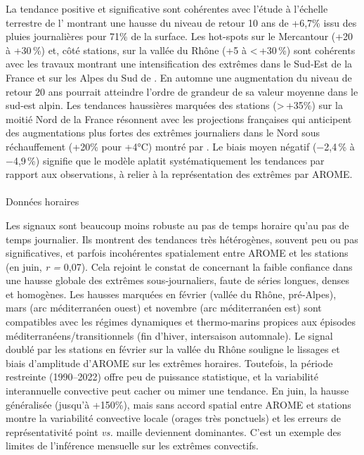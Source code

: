 \documentclass[
  article,
  nofooter,
  noheadings]{jss}
\makeatletter
\let\oldparagraph\paragraph
\renewcommand{\paragraph}{
    \@ifstar
      \xxxParagraphStar
      \xxxParagraphNoStar
  }
\newcommand{\xxxParagraphStar}[1]{\oldparagraph*{#1}\mbox{}}
\newcommand{\xxxParagraphNoStar}[1]{\oldparagraph{#1}\mbox{}}
\makeatother
\begin{document}
La tendance positive et significative sont cohérentes avec l'étude à
l'échelle terrestre de l'\citet{IPCC2021} montrant une hausse du niveau
de retour 10 ans de +6,7\% issu des pluies journalières pour 71\% de la
surface. Les hot-spots sur le Mercantour (+20 à +30\,\%) et, côté
stations, sur la vallée du Rhône (+5 à \textless\,+30\,\%) sont
cohérents avec les travaux montrant une intensification des extrêmes
dans le Sud‑Est de la France et sur les Alpes du Sud de
\citet{blanchet2021explaining}. En automne une augmentation du niveau de
retour 20 ans pourrait atteindre l'ordre de grandeur de sa valeur
moyenne dans le sud‑est alpin. Les tendances haussières marquées des
stations (\textgreater\,+35\%) sur la moitié Nord de la France résonnent
avec les projections françaises qui anticipent des augmentations plus
fortes des extrêmes journaliers dans le Nord sous réchauffement (+20\%
pour +4°C) montré par \citet{soubeyroux:hal-04991790}. Le biais moyen
négatif (−2,4\,\% à −4,9\,\%) signifie que le modèle aplatit
systématiquement les tendances par rapport aux observations, à relier à
la représentation des extrêmes par AROME.

\paragraph{Données horaires}\label{donnuxe9es-horaires-1}

Les signaux sont beaucoup moins robuste au pas de temps horaire qu'au
pas de temps journalier. Ils montrent des tendances très hétérogènes,
souvent peu ou pas significatives, et parfois incohérentes spatialement
entre AROME et les stations (en juin, \emph{r =} 0,07). Cela rejoint le
constat de \citet{IPCC2021} concernant la faible confiance dans une
hausse globale des extrêmes sous‑journaliers, faute de séries longues,
denses et homogènes. Les hausses marquées en février (vallée du Rhône,
pré‑Alpes), mars (arc méditerranéen ouest) et novembre (arc
méditerranéen est) sont compatibles avec les régimes dynamiques et
thermo‑marins propices aux épisodes méditerranéens/transitionnels (fin
d'hiver, intersaison automnale). Le signal doublé par les stations en
février sur la vallée du Rhône souligne le lissages et biais d'amplitude
d'AROME sur les extrêmes horaires. Toutefois, la période restreinte
(1990--2022) offre peu de puissance statistique, et la variabilité
interannuelle convective peut cacher ou mimer une tendance. En juin, la
hausse généralisée (jusqu'à +150\%), mais sans accord spatial entre
AROME et stations montre la variabilité convective locale (orages très
ponctuels) et les erreurs de représentativité point \emph{vs.} maille
deviennent dominantes. C'est un exemple des limites de l'inférence
mensuelle sur les extrêmes convectifs.\\
\end{document}
